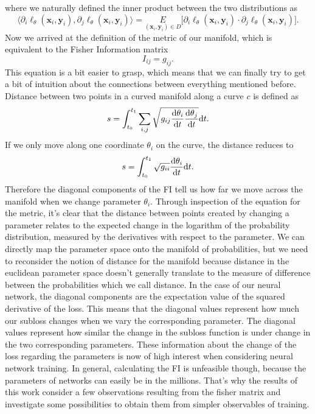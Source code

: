 where we naturally defined the inner product between the two distributions as
\begin{equation}
	 \langle \partial_i \ell_\theta(\mathbf{x}_i,\mathbf{y}_i), \partial_j \ell_\theta(\mathbf{x}_i,\mathbf{y}_i) \rangle = \underset{(\mathbf{x}_i,\mathbf{y}_i)\in D}{E} \big[\partial_i \ell_\theta(\mathbf{x}_i,\mathbf{y}_i) \cdot \partial_j \ell_\theta(\mathbf{x}_i,\mathbf{y}_i)\big].
\end{equation}
Now we arrived at the definition of the metric of our manifold, which is equivalent to the Fisher Information matrix
\begin{equation}
	I_{ij} = g_{ij}.
\end{equation}
This equation is a bit easier to grasp, which means that we can finally try to get a bit of intuition about the connections between everything mentioned before. Distance between two points in a curved manifold along a curve $c$ is defined as 
\begin{equation}
	s = \int_{t_0}^{t_1} \sum_{i,j} \sqrt{g_{ij}\frac{\mathrm{d}\theta_i}{\mathrm{d}t}\frac{\mathrm{d}\theta_j}{\mathrm{d}t}} \mathrm{d}t. 
\end{equation}
If we only move along one coordinate $\theta_i$ on the curve, the distance reduces to 
\begin{equation}
	s = \int_{t_0}^{t_1} \sqrt{g_{ii}}\frac{\mathrm{d}\theta_i}{\mathrm{d}t} \mathrm{d}t. 
\end{equation}
Therefore the diagonal components of the FI tell us how far we move across the manifold when we change parameter $\theta_i$. Through inspection of the equation for the metric, it's clear that the distance between points created by changing a parameter relates to the expected change in the logarithm of the probability distribution, measured by the derivatives with respect to the parameter. We can directly map the parameter space onto the manifold of probabilities, but we need to reconsider the notion of distance for the manifold because distance in the euclidean parameter space doesn't generally translate to the measure of difference between the probabilities which we call distance. In the case of our neural network, the diagonal components are the expectation value of the squared derivative of the loss. This means that the diagonal values represent how much our subloss changes when we vary the corresponding parameter. The diagonal values represent how similar the change in the subloss function is under change in the two corresponding parameters. These information about the change of the loss regarding the parameters is now of high interest when considering neural network training. In general, calculating the FI is unfeasible though, because the parameters of networks can easily be in the millions. That's why the results of this work consider a few observations resulting from the fisher matrix and investigate some possibilities to obtain them from simpler observables of training.